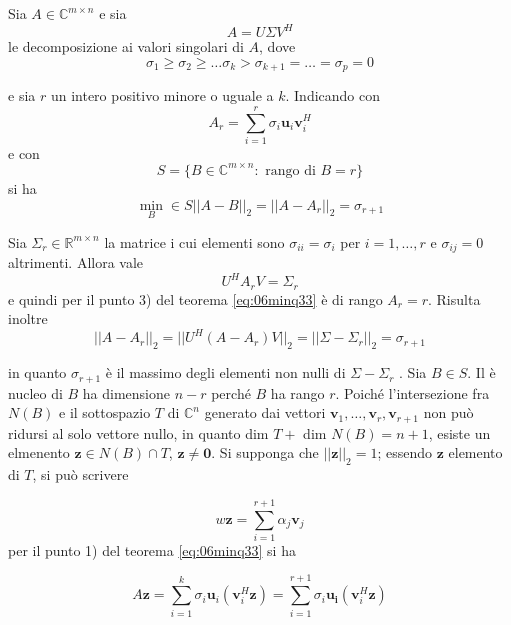 \begin{theo} Sia $A \in \mathbb{C}^{m \times n}$ e sia
$$ A = U \Sigma V^{H}$$
le decomposizione ai valori singolari di $A$, dove
$$ \sigma_1 \geq \sigma_2 \geq \ldots \sigma_k >
\sigma_{k+1} = \ldots = \sigma_p = 0
$$

e sia $r$ un intero positivo minore o uguale a $k$. Indicando con
$$ A_{r} = \displaystyle \sum_{i=1}^{r} \sigma_i 
\mathbf{u}_{i} \mathbf{v}_{i}^{H} 
$$
e con
$$ S = \{ B \in \mathbb{C}^{m \times n} : \text{ rango di } B = r \}$$
si ha
$$
\min_{B} \in S || A - B||_{2} = ||A - A_{r} ||_{2} = \sigma_{r+1}
 $$
\end{theo}
\begin{thproof}
 Sia $\Sigma_{r} \in \mathbb{R}^{m \times n}$ la matrice i cui
elementi sono $\sigma_{ii} = \sigma_i$ per $i=1, \ldots, r$
e $\sigma_{ij} = 0$ altrimenti. Allora vale
$$ U^{H} A_{r} V = \Sigma_{r} $$
e quindi per il punto 3) del teorema
\ref{eq:06minq33}
\`e di rango $A_{r} = r$. Risulta inoltre
\begin{equation}
\label{eq:06minq49}
 ||A - A_{r}||_{2} = ||U^{H}(A - A_r)V||_{2} = 
|| \Sigma - \Sigma_r||_{2} = \sigma_{r+1}
\end{equation}

in quanto $\sigma_{r+1}$ \`e il massimo degli elementi non nulli di
 $\Sigma −\Sigma_{r}$ . Sia $B \in S$. Il
\`e nucleo di $B$ ha dimensione $n- r$ perch\'e $B$ ha rango $r$. 
Poich\'e l'intersezione
fra $N(B)$ e il sottospazio $T$ di $\mathbb{C}^n$ generato dai vettori $\mathbf{v}_1 , \ldots , \mathbf{v}_{r} , 
\mathbf{v}_{r+1}$ non
pu\`o ridursi al solo vettore nullo, in quanto dim 
 $T  + $ dim $N(B) = n + 1$, esiste un elmenento
$\mathbf{z} \in N(B) \cap T$, $\mathbf{z} \neq \mathbf{0}$.
Si supponga che $||\mathbf{z}||_2 = 1$; essendo
$\mathbf{z}$ elemento di $T$, si pu\`o scrivere

\begin{equation}
\label{eq:06minq50}
w \mathbf{z} = \displaystyle \sum_{i=1}^{r+1} \alpha_j
\mathbf{v}_{j}
\end{equation}
per il punto 1) del teorema
\ref{eq:06minq33} si ha

\begin{equation}
\label{eq:06minq51}
A\mathbf{z} = 
\displaystyle \sum_{i=1}^{k}
\sigma_i \mathbf{u}_{i}(\mathbf{v}^{H}_i \mathbf{z})
= \displaystyle \sum_{i=1}^{r+1} \sigma_i \mathbf{u_i}
(\mathbf{v}_{i}^{H}\mathbf{z})
\end{equation}


\end{thproof}
